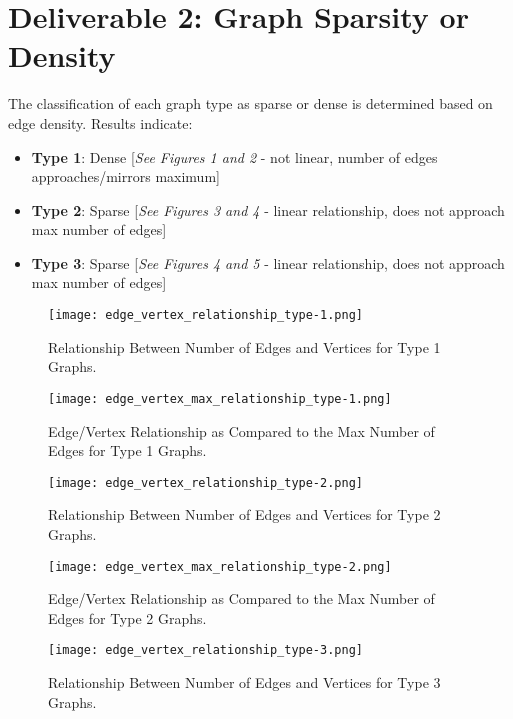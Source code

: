 \documentclass{article}
\begin{document}
\section*{Deliverable 2: Graph Sparsity or Density}
The classification of each graph type as sparse or dense is determined based on edge density.
Results indicate:
\begin{itemize}
    \item \textbf{Type 1}: Dense [\textit{See Figures 1 and 2} - not linear, number of edges approaches/mirrors maximum]
    \item \textbf{Type 2}: Sparse [\textit{See Figures 3 and 4} - linear relationship, does not approach max number of edges]
    \item \textbf{Type 3}: Sparse [\textit{See Figures 4 and 5} - linear relationship, does not approach max number of edges]
\end{itemize}

\newpage

\begin{figure}[h!]
\centering
\texttt{[image: edge\_vertex\_relationship\_type-1.png]}
\caption{Relationship Between Number of Edges and Vertices for Type 1 Graphs.}
\end{figure}

\begin{figure}[h!]
\centering
\texttt{[image: edge\_vertex\_max\_relationship\_type-1.png]}
\caption{Edge/Vertex Relationship as Compared to the Max Number of Edges for Type 1 Graphs.}
\end{figure}

\newpage

\begin{figure}[h!]
\centering
\texttt{[image: edge\_vertex\_relationship\_type-2.png]}
\caption{Relationship Between Number of Edges and Vertices for Type 2 Graphs.}
\end{figure}

\begin{figure}[h!]
\centering
\texttt{[image: edge\_vertex\_max\_relationship\_type-2.png]}
\caption{Edge/Vertex Relationship as Compared to the Max Number of Edges for Type 2 Graphs.}
\end{figure}

\newpage

\begin{figure}[h!]
\centering
\texttt{[image: edge\_vertex\_relationship\_type-3.png]}
\caption{Relationship Between Number of Edges and Vertices for Type 3 Graphs.}
\end{figure}
\end{document}
